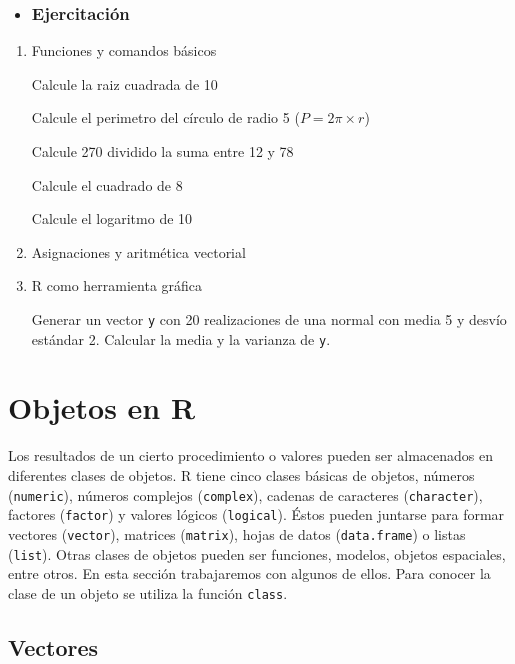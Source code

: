 \documentclass[
]{book}
\newenvironment{rmdblock}[1]
{\begin{shaded*}
		\begin{itemize}
			\renewcommand{\labelitemi}{
				\raisebox{-.7\height}[0pt][0pt]{
					{\setkeys{Gin}{width=3em,keepaspectratio}\texttt{[image: images/\#1]}}
				}
			}
			\item
		}
		{
		\end{itemize}
	\end{shaded*}
}
\newenvironment{rmdtip}
{\begin{rmdblock}{tip}}
	{\end{rmdblock}}
\begin{document}
\begin{rmdtip}
\hypertarget{ejercitaciuxf3n}{%
\subsection{Ejercitación}\label{ejercitaciuxf3n}}
\end{rmdtip}

\begin{enumerate}
\def\labelenumi{\arabic{enumi}.}
\item
  Funciones y comandos básicos

  Calcule la raiz cuadrada de 10

  Calcule el perimetro del círculo de radio 5 (\(P = 2\pi \times r\))

  Calcule 270 dividido la suma entre 12 y 78

  Calcule el cuadrado de 8

  Calcule el logaritmo de 10
\item
  Asignaciones y aritmética vectorial
\item
  R como herramienta gráfica

  Generar un vector \texttt{y} con 20 realizaciones de una normal con media 5 y desvío estándar 2. Calcular la media y la varianza de \texttt{y}.
\end{enumerate}

\hypertarget{objetos-en-r}{%
\chapter{Objetos en R}\label{objetos-en-r}}

Los resultados de un cierto procedimiento o valores pueden ser almacenados en diferentes clases de objetos. R tiene cinco clases básicas de objetos, números (\texttt{numeric}), números complejos (\texttt{complex}), cadenas de caracteres (\texttt{character}), factores (\texttt{factor}) y valores lógicos (\texttt{logical}). Éstos pueden juntarse para formar vectores (\texttt{vector}), matrices (\texttt{matrix}), hojas de datos (\texttt{data.frame}) o listas (\texttt{list}). Otras clases de objetos pueden ser funciones, modelos, objetos espaciales, entre otros. En esta sección trabajaremos con algunos de ellos. Para conocer la clase de un objeto se utiliza la función \texttt{class}.

\hypertarget{vectores}{%
\section{Vectores}\label{vectores}}
\end{document}

